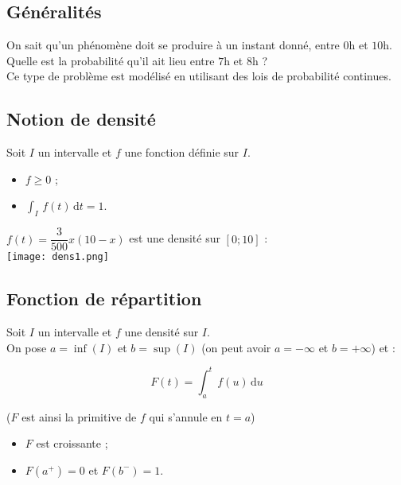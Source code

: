 \documentclass[a4paper,11pt]{article} \usepackage{FBarticle} \mapage{831}{Probabilités 2} %
\begin{document}

\begin{multicols}{2}

\section{Généralités}
On sait qu'un phénomène doit se produire à un instant donné, entre $0$h et $10$h. Quelle est la probabilité qu'il ait lieu entre $7$h et $8$h ?\\
Ce type de problème est modélisé en utilisant des lois de probabilité continues.

\subsection{Notion de densité}
Soit $I$ un intervalle et $f$ une fonction définie sur $I$.\par
{}

\begin{itemize}
	\item $f\geq0$ ;
	\item $\displaystyle\int_I\,f(t)\,\textrm{d}t=1$.
\end{itemize}
\exem $f(t)=\dfrac{3}{500}x(10-x)$ est une densité sur $[0;10]$ :\\
\texttt{[image: dens1.png]}\par




\subsection{Fonction de répartition}
Soit $I$ un intervalle et $f$ une densité sur $I$.\\
On pose $a=\inf(I)$  et $b=\sup(I)$ (on peut avoir $a=-\infty$ et $b=+\infty$) et :

$$F(t)=\int_a^t\,f(u)\,\textrm{d}u$$

($F$ est ainsi la primitive de $f$ qui s'annule en $t=a$)\par

\par

\prop \begin{itemize}
	\item $F$ est croissante ;
	\item $F(a^+)=0$ et $F(b^-)=1$.
\end{itemize}


\end{multicols}
\end{document}
